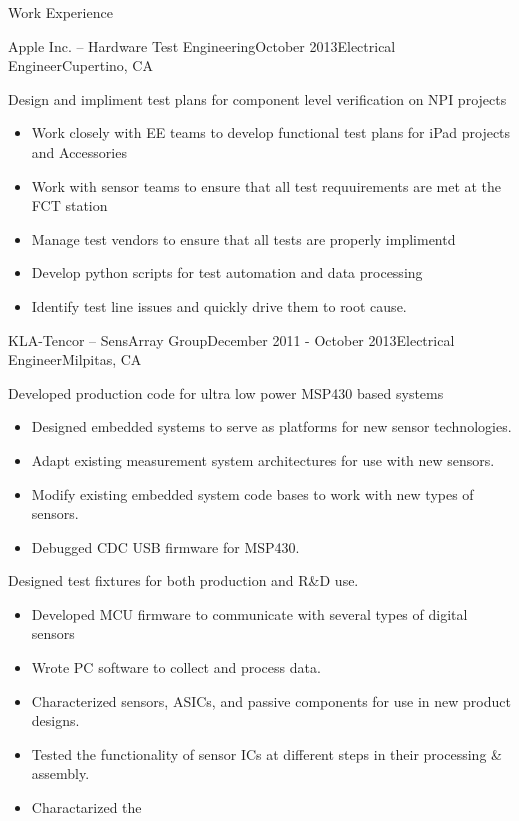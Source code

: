 \documentclass{resume} %
\begin{document}
\begin{rSection}{Work Experience}

\begin{rSubsection}{Apple Inc. -- Hardware Test Engineering}{October 2013}{Electrical Engineer}{Cupertino, CA}
\smallskip

\item Design and impliment test plans for component level verification on NPI projects
\begin{itemize}
\itemsep -0.5em \vspace{-0.5em}
\renewcommand{\labelitemi}{-}
\item Work closely with EE teams to develop functional test plans for iPad projects and Accessories
\item Work with sensor teams to ensure that all test requuirements are met at the FCT station
\item Manage test vendors to ensure that all tests are properly implimentd 
\item Develop python scripts for test automation and data processing
\item Identify test line issues and quickly drive them to root cause.
\end{itemize}
\medskip

\end{rSubsection}

\begin{rSubsection}{KLA-Tencor -- SensArray Group}{December 2011 - October 2013}{Electrical Engineer}{Milpitas, CA}
\smallskip

\item Developed production code for ultra low power MSP430 based systems
\begin{itemize}
\itemsep -0.5em \vspace{-0.5em}
\renewcommand{\labelitemi}{-}
\item Designed embedded systems to serve as platforms for new sensor technologies.
\item Adapt existing measurement system architectures for use with new sensors.
\item Modify existing embedded system code bases to work with new types of sensors.
\item Debugged CDC USB firmware for MSP430.
\end{itemize}
\medskip

\item Designed test fixtures for both production and R\&D use.
\begin{itemize}
\itemsep -0.5em \vspace{-0.5em}
\renewcommand{\labelitemi}{-}
\item Developed MCU firmware to communicate with several types of digital sensors
\item Wrote PC software to collect and process data.
\item Characterized sensors, ASICs, and passive components for use in new product designs.
\item Tested the functionality of sensor ICs at different steps in their processing \& assembly.
\item Charactarized the 
\end{itemize}
\medskip


\end{rSubsection}
\end{rSection}
\end{document}

